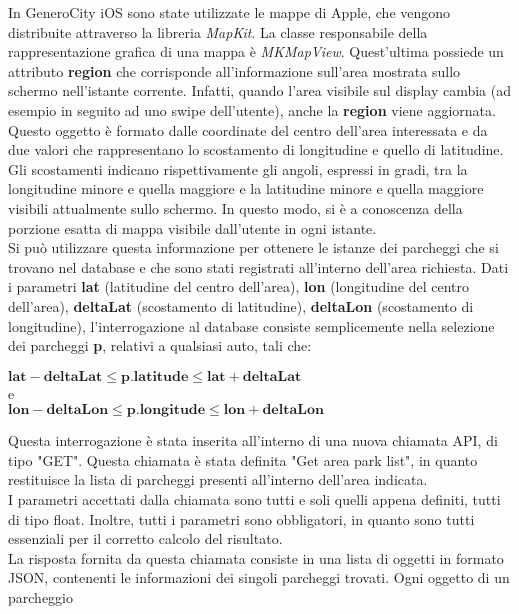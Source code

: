 In GeneroCity iOS sono state utilizzate le mappe di Apple, che vengono distribuite
attraverso la libreria \emph{MapKit}. La classe responsabile della rappresentazione
grafica di una mappa è \emph{MKMapView}. Quest'ultima possiede un attributo \textbf{region}
che corrisponde all'informazione sull'area mostrata sullo schermo nell'istante corrente.
Infatti, quando l'area visibile sul display cambia (ad esempio in seguito ad uno swipe
dell'utente), anche la \textbf{region} viene aggiornata. Questo oggetto è formato dalle
coordinate del centro dell'area interessata e da due valori che rappresentano lo 
scostamento di longitudine e quello di latitudine. Gli scostamenti indicano rispettivamente gli
angoli, espressi in gradi, tra la longitudine minore e quella maggiore e la latitudine 
minore e quella maggiore visibili attualmente sullo schermo. In questo modo, si è a conoscenza della porzione esatta di mappa visibile dall'utente
in ogni istante.\\
Si può utilizzare questa informazione per ottenere le istanze dei parcheggi che si trovano 
nel database e che sono stati registrati all'interno dell'area richiesta.
Dati i parametri \textbf{lat} (latitudine del centro dell'area), \textbf{lon} 
(longitudine del centro dell'area), \textbf{deltaLat} (scostamento di latitudine), 
\textbf{deltaLon} (scostamento di longitudine), l'interrogazione
al database consiste semplicemente nella selezione dei parcheggi \textbf{p}, relativi
a qualsiasi auto, tali che:
\begin{center}
    $ \textbf{lat} - \textbf{deltaLat} \le \textbf{p.latitude} \le \textbf{lat} + \textbf{deltaLat}$\\
    e\\
    $ \textbf{lon} - \textbf{deltaLon} \le \textbf{p.longitude} \le \textbf{lon} + \textbf{deltaLon}$
\end{center}
Questa interrogazione è stata inserita all'interno di una nuova chiamata API, di tipo "GET".
Questa chiamata è stata definita "Get area park list", in quanto restituisce la lista di 
parcheggi presenti all'interno dell'area indicata.\\
I parametri accettati dalla chiamata sono tutti e soli quelli appena definiti,
tutti di tipo float. Inoltre, tutti i parametri sono obbligatori, in quanto 
sono tutti essenziali per il corretto calcolo del risultato.\\
La risposta fornita da questa chiamata consiste in una lista di oggetti in formato JSON, 
contenenti le informazioni dei singoli parcheggi trovati. Ogni oggetto di un parcheggio
